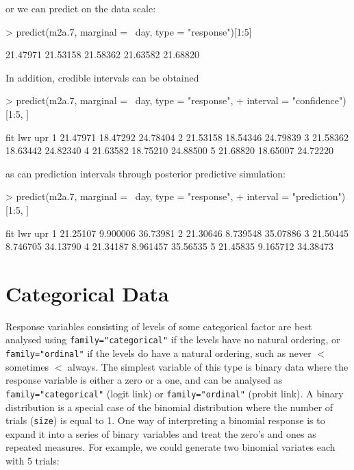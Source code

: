 \documentclass{article}
\begin{document}
or we can predict on the data scale:

\begin{Schunk}
\begin{Sinput}
> predict(m2a.7, marginal = ~day, type = "response")[1:5]
\end{Sinput}
\begin{Soutput}
[1] 21.47971 21.53158 21.58362 21.63582 21.68820
\end{Soutput}
\end{Schunk}

In addition, credible intervals can be obtained 

\begin{Schunk}
\begin{Sinput}
> predict(m2a.7, marginal = ~day, type = "response", 
+     interval = "confidence")[1:5, ]
\end{Sinput}
\begin{Soutput}
       fit      lwr      upr
1 21.47971 18.47292 24.78404
2 21.53158 18.54346 24.79839
3 21.58362 18.63442 24.82340
4 21.63582 18.75210 24.88500
5 21.68820 18.65007 24.72220
\end{Soutput}
\end{Schunk}

as can prediction intervals through posterior predictive simulation:

\begin{Schunk}
\begin{Sinput}
> predict(m2a.7, marginal = ~day, type = "response", 
+     interval = "prediction")[1:5, ]
\end{Sinput}
\begin{Soutput}
       fit      lwr      upr
1 21.25107 9.900006 36.73981
2 21.30646 8.739548 35.07886
3 21.50445 8.746705 34.13790
4 21.34187 8.961457 35.56535
5 21.45835 9.165712 34.38473
\end{Soutput}
\end{Schunk}

\section{Categorical Data}

Response variables consisting of levels of some categorical factor are best analysed using \texttt{family="categorical"} if the levels have no natural ordering,  or \texttt{family="ordinal"} if the levels do have a natural ordering, such as never $<$ sometimes $<$ always. The simplest variable of this type is binary data where the response variable is either a zero or a one, and can be analysed as \texttt{family="categorical"} (logit link) or \texttt{family="ordinal"} (probit link).   A binary distribution is a special case of the binomial distribution where the number of trials (\texttt{size}) is equal to 1. One way of interpreting a binomial response is to expand it into a series of binary variables and treat the zero's and ones as repeated measures. For example, we could generate two binomial variates each with 5 trials:
\end{document}
